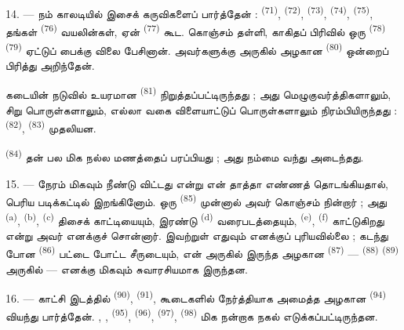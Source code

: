 14. --- நம் காலடியில் இசைக் கருவிகளைப் பார்த்தேன் : 
\textsuperscript{(71)},  \textsuperscript{(72)},
 \textsuperscript{(73)},  \textsuperscript{(74)}, 
\textsuperscript{(75)}, தங்கள் 
\textsuperscript{(76)} வயலின்கள், ஏன் 
\textsuperscript{(77)} கூட. கொஞ்சம் தள்ளி, காகிதப் பிரிவில் ஒரு
 \textsuperscript{(78)} 
\textsuperscript{(79)} ஏட்டுப் பைக்கு விலை பேசினான். அவர்களுக்கு
அருகில் அழகான  \textsuperscript{(80)}
ஒன்றைப் பிரித்து அறிந்தேன்.

கடையின் நடுவில் உயரமான 
\textsuperscript{(81)} நிறுத்தப்பட்டிருந்தது ; அது மெழுகுவர்த்திகளாலும்,
சிறு பொருள்களாலும், எல்லா வகை விளையாட்டுப் பொருள்களாலும்
நிரம்பியிருந்தது :  \textsuperscript{(82)},
 \textsuperscript{(83)} முதலியன.

 \textsuperscript{(84)} தன்  பல  மிக நல்ல
மணத்தைப் பரப்பியது ; அது நம்மை வந்து அடைந்தது.

\VUsaut{3.4mm}
\VUsaut{2.8mm}

15. --- நேரம் மிகவும் நீண்டு விட்டது என்று என் தாத்தா எண்ணத்
தொடங்கியதால், பெரிய படிக்கட்டில் இறங்கினோம். ஒரு  \textsuperscript{(85)} முன்னால் அவர் கொஞ்சம் நின்றார் ;
அது  \textsuperscript{(a)},
 \textsuperscript{(b)},
 \textsuperscript{(c)}
 திசைக் காட்டியையும்,
இரண்டு  \textsuperscript{(d)} வரைபடத்தையும்,
 \textsuperscript{(e)},  \textsuperscript{(f)} காட்டுகிறது என்று அவர் எனக்குச்
சொன்னார். இவற்றுள் எதுவும் எனக்குப் புரியவில்லை ; கடந்து போன
 \textsuperscript{(86)} பட்டை போட்ட
சீருடையும், என் அருகில் இருந்த அழகான 
\textsuperscript{(87)} — 
\textsuperscript{(88)} 
\textsuperscript{(89)} அருகில் — எனக்கு மிகவும் சுவாரசியமாக
இருந்தன.

16. --- காட்சி இடத்தில்  \textsuperscript{(90)},
 \textsuperscript{(91)}, கூடைகளில்
நேர்த்தியாக அமைத்த அழகான 
\textsuperscript{(94)} வியந்து பார்த்தேன். , ,  \textsuperscript{(95)}, 
\textsuperscript{(96)}, 
\textsuperscript{(97)}, 
\textsuperscript{(98)} மிக நன்றாக நகல் எடுக்கப்பட்டிருந்தன.

